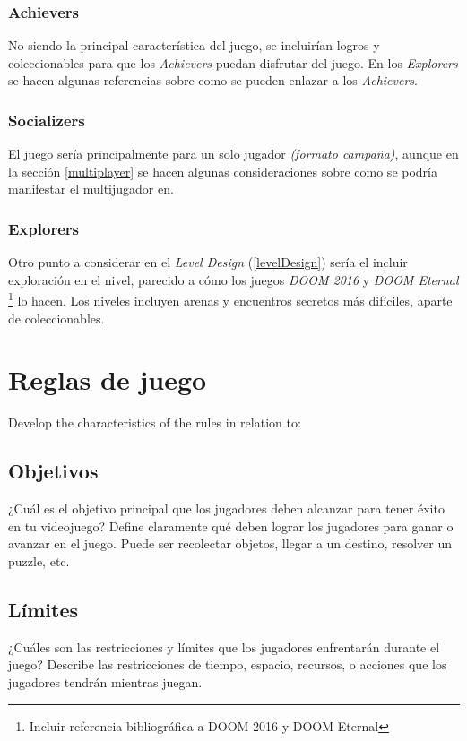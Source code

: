        \subsubsection{Achievers}
            No siendo la principal característica del juego, se incluirían logros y coleccionables para que los \textit{Achievers} puedan disfrutar del juego. En los \textit{Explorers} se hacen algunas referencias sobre como se pueden enlazar a los \textit{Achievers}.
        \subsubsection{Socializers}
            El juego sería principalmente para un solo jugador \textit{(formato campaña)}, aunque en la sección \ref{multiplayer} se hacen algunas consideraciones sobre como se podría manifestar el multijugador en\TWD.
        \subsubsection{Explorers}
            Otro punto a considerar en el \textit{Level Design} (\ref{levelDesign}) sería el incluir exploración en el nivel, parecido a cómo los juegos \textit{DOOM 2016} y \textit{DOOM Eternal} \footnote{Incluir referencia bibliográfica a DOOM 2016 y DOOM Eternal} lo hacen. Los niveles incluyen arenas y encuentros secretos más difíciles, aparte de coleccionables.


\section{Reglas de juego}
Develop the characteristics of the rules in relation to:

    \subsection{Objetivos}
    ¿Cuál es el objetivo principal que los jugadores deben alcanzar para tener éxito en tu videojuego?
    Define claramente qué deben lograr los jugadores para ganar o avanzar en el juego. Puede ser recolectar objetos, llegar a un destino, resolver un puzzle, etc.

    \subsection{Límites}
    ¿Cuáles son las restricciones y límites que los jugadores enfrentarán durante el juego?
    Describe las restricciones de tiempo, espacio, recursos, o acciones que los jugadores tendrán mientras juegan.

